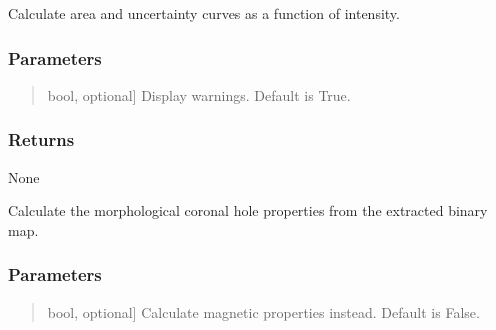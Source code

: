 \documentclass[letterpaper,10pt,english]{sphinxmanual}
\begin{document}
\begin{fulllineitems}
\begin{fulllineitems}
\end{fulllineitems}


\begin{fulllineitems}
\label{\detokenize{pycatch/pycatch:pycatch.pycatch.pycatch.calculate_curves}}
\pysigstartsignatures
{}
\pysigstopsignatures
\sphinxAtStartPar
Calculate area and uncertainty curves as a function of intensity.


\subsubsection{Parameters}
\label{\detokenize{pycatch/pycatch:id3}}\begin{quote}
\begin{description}
\sphinxlineitem{verbose}{[}bool, optional{]}
\sphinxAtStartPar
Display warnings. Default is True.

\end{description}
\end{quote}


\subsubsection{Returns}
\label{\detokenize{pycatch/pycatch:id4}}
\sphinxAtStartPar
None

\end{fulllineitems}


\begin{fulllineitems}
\label{\detokenize{pycatch/pycatch:pycatch.pycatch.pycatch.calculate_properties}}
\pysigstartsignatures
{}
\pysigstopsignatures
\sphinxAtStartPar
Calculate the morphological coronal hole properties from the extracted binary map.


\subsubsection{Parameters}
\label{\detokenize{pycatch/pycatch:id5}}\begin{quote}
\begin{description}
\sphinxlineitem{mag}{[}bool, optional{]}
\sphinxAtStartPar
Calculate magnetic properties instead. Default is False.


\end{description}
\end{quote}
\end{fulllineitems}
\end{fulllineitems}
\end{document}
